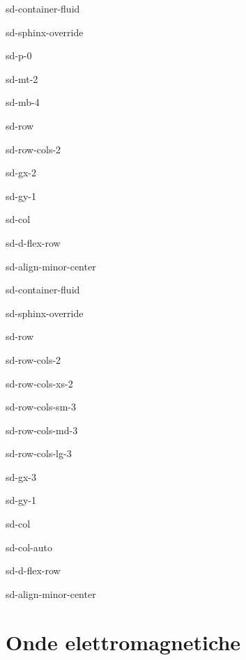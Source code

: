 \documentclass[letterpaper,10pt,italian]{jupyterBook}
\begin{document}
\begin{sphinxuseclass}{sd-container-fluid}
\begin{sphinxuseclass}{sd-sphinx-override}
\begin{sphinxuseclass}{sd-p-0}
\begin{sphinxuseclass}{sd-mt-2}
\begin{sphinxuseclass}{sd-mb-4}
\begin{sphinxuseclass}{sd-row}
\begin{sphinxuseclass}{sd-row-cols-2}
\begin{sphinxuseclass}{sd-gx-2}
\begin{sphinxuseclass}{sd-gy-1}
\begin{sphinxuseclass}{sd-col}
\begin{sphinxuseclass}{sd-d-flex-row}
\begin{sphinxuseclass}{sd-align-minor-center}
\begin{sphinxuseclass}{sd-container-fluid}
\begin{sphinxuseclass}{sd-sphinx-override}
\begin{sphinxuseclass}{sd-row}
\begin{sphinxuseclass}{sd-row-cols-2}
\begin{sphinxuseclass}{sd-row-cols-xs-2}
\begin{sphinxuseclass}{sd-row-cols-sm-3}
\begin{sphinxuseclass}{sd-row-cols-md-3}
\begin{sphinxuseclass}{sd-row-cols-lg-3}
\begin{sphinxuseclass}{sd-gx-3}
\begin{sphinxuseclass}{sd-gy-1}
\begin{sphinxuseclass}{sd-col}
\begin{sphinxuseclass}{sd-col-auto}
\begin{sphinxuseclass}{sd-d-flex-row}
\begin{sphinxuseclass}{sd-align-minor-center}
\end{sphinxuseclass}
\end{sphinxuseclass}
\end{sphinxuseclass}
\end{sphinxuseclass}
\end{sphinxuseclass}
\end{sphinxuseclass}
\end{sphinxuseclass}
\end{sphinxuseclass}
\end{sphinxuseclass}
\end{sphinxuseclass}
\end{sphinxuseclass}
\end{sphinxuseclass}
\end{sphinxuseclass}
\end{sphinxuseclass}
\end{sphinxuseclass}
\end{sphinxuseclass}
\end{sphinxuseclass}
\end{sphinxuseclass}
\end{sphinxuseclass}
\end{sphinxuseclass}
\end{sphinxuseclass}
\end{sphinxuseclass}
\end{sphinxuseclass}
\end{sphinxuseclass}
\end{sphinxuseclass}
\end{sphinxuseclass}

\chapter{Onde elettromagnetiche}
\label{\detokenize{ch/waves:onde-elettromagnetiche}}\label{\detokenize{ch/waves:classical-electromagnetism-waves}}\label{\detokenize{ch/waves::doc}}
\sphinxstepscope
\end{document}
